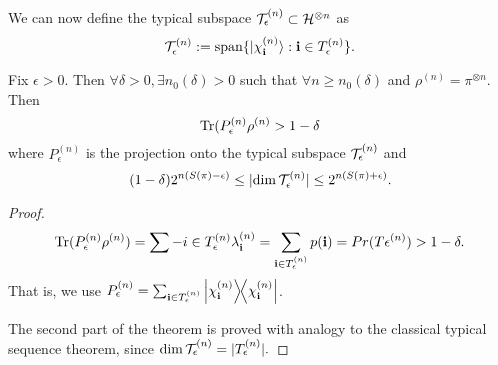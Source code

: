 We can now define the typical subspace $\mathcal T_\epsilon^{(n)}\subset \mathcal H^{\otimes n}$ as
\begin{equation}
    \mathcal T_\epsilon^{(n)} := \text{span}\{\lvert\chi_{\boldsymbol{\mathbf{i}}}^{(n)}\rangle : \boldsymbol{\mathbf{i}} \in T_\epsilon^{(n)}\}.
\end{equation}

\begin{thm}
    Fix $\epsilon>0$. Then $\forall \delta >0, \exists n_0(\delta) >0$ such that $\forall n \geq n_0(\delta)$ and $\rho^{(n)}=\pi^{\otimes n}$. Then
    \begin{equation}
        \operatorname{Tr}(P_\epsilon^{(n)} \rho^{(n)} > 1-\delta
    \end{equation}
    where $P_\epsilon^{(n)}$ is the projection onto the typical subspace $\mathcal T_\epsilon^{(n)}$ and
    \begin{equation}
        (1-\delta) 2^{n(S(\pi)-\epsilon)}\leq \lvert\dim \mathcal T_\epsilon^{(n)}\rvert \leq 2^{n(S(\pi)+\epsilon)}.
    \end{equation}
\end{thm}
\begin{proof}
\begin{equation}
    \operatorname{Tr}(P_\epsilon^{(n)} \rho^{(n)}) = \sum-{i\in T_\epsilon^{(n)}} \lambda_{\boldsymbol{\mathbf{i}}}^{(n)} =\sum_{\boldsymbol{\mathbf{i}} \in T_\epsilon^{(n)}} p({\boldsymbol{\mathbf{i}}}) = Pr(T\epsilon^{(n)})>1-\delta.
\end{equation}
That is, we use $P_\epsilon^{(n)} = \sum_{\boldsymbol{\mathbf{i}}\in T_\epsilon^{(n)}}\left\lvert{\chi_{\boldsymbol{\mathbf{i}}}^{(n)}}\middle\rangle\!\middle\langle{\chi_{\boldsymbol{\mathbf{i}}}^{(n)}}\right\rvert$.

The second part of the theorem is proved with analogy to the classical typical sequence theorem, since $\dim \mathcal T_\epsilon^{(n)}=|T_\epsilon^{(n)}|.$
\end{proof}

